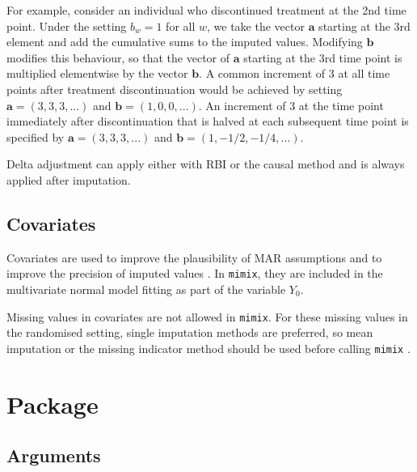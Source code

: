 For example, consider an individual who discontinued treatment at the 2nd time point. 
Under the setting $b_w=1$ for all $w$, we take the vector $\boldsymbol{a}$ starting at the 3rd element and add the cumulative sums to the imputed values. 
Modifying $\boldsymbol{b}$ modifies this behaviour, so that the vector of $\boldsymbol{a}$ starting at the 3rd time point is multiplied elementwise by the vector $\boldsymbol{b}$. 
A common increment of 3 at all time points after treatment discontinuation would be achieved by setting $\boldsymbol{a}=(3,3,3,...)$ and $\boldsymbol{b}=(1,0,0,...)$.
An increment of 3 at the time point immediately after discontinuation that is halved at each subsequent time point is specified by  
$\boldsymbol{a}=(3,3,3,...)$ and $\boldsymbol{b}=(1,-1/2,-1/4,...)$.


Delta adjustment can apply either with RBI or the causal method and is always applied after imputation.

\subsection{Covariates}

Covariates are used to improve the plausibility of MAR assumptions and to improve the precision of imputed values \citep{ian:MItutorial}. 
In \texttt{mimix}, they are included in the multivariate normal model fitting as part of the variable $Y_0$. 

Missing values in covariates are not allowed in \texttt{mimix}. For these missing values in the randomised setting, single imputation methods are preferred, so mean imputation or the missing indicator method should be used before calling \texttt{mimix} \citep{ian:MIinRCTs}.


\section{Package}

\subsection{Arguments} 

